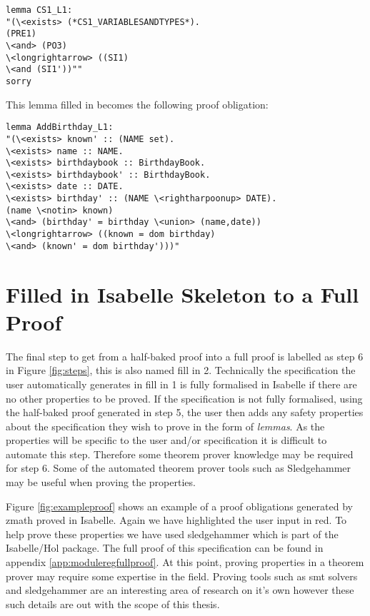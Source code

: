\begin{verbatim}
lemma CS1_L1:
"(\<exists> (*CS1_VARIABLESANDTYPES*).
(PRE1)
\<and> (PO3)
\<longrightarrow> ((SI1)
\<and (SI1'))""
sorry
\end{verbatim}

This lemma filled in becomes the following proof obligation:

\begin{verbatim}
lemma AddBirthday_L1:
"(\<exists> known' :: (NAME set).
\<exists> name :: NAME.
\<exists> birthdaybook :: BirthdayBook.
\<exists> birthdaybook' :: BirthdayBook.
\<exists> date :: DATE.
\<exists> birthday' :: (NAME \<rightharpoonup> DATE).
(name \<notin> known)
\<and> (birthday' = birthday \<union> (name,date))
\<longrightarrow> ((known = dom birthday)
\<and> (known' = dom birthday')))"
\end{verbatim}

\section{Filled in Isabelle Skeleton to a Full Proof}
\label{sec:isa2ful}

The final step to get from a half-baked proof into a full proof is labelled as
step 6 in Figure \ref{fig:steps}, this is also named fill in 2. Technically the
specification the user automatically generates in fill in 1 is fully formalised
in Isabelle if there are no other properties to be proved. If the specification
is not fully formalised, using the half-baked proof generated in step 5, the
user then adds any safety properties about the specification they wish to prove
in the form of \emph{lemmas}. As the properties will be specific to the user
and/or specification it is difficult to automate this step. Therefore some
theorem prover knowledge may be required for step 6. Some of the automated
theorem prover tools such as Sledgehammer \cite{sledgehammer} may be useful when
proving the properties.

Figure \ref{fig:exampleproof} shows an example of a proof obligations generated
by \gls{zmath} proved in Isabelle. Again we have highlighted the user input in
{\color{red}red}. To help prove these properties we have used sledgehammer
\cite{sledgehammer} which is part of the Isabelle/Hol package. The full proof of
this specification can be found in appendix \ref{app:moduleregfullproof}. At
this point, proving properties in a theorem prover may require some expertise in
the field. Proving tools such as \gls{smt} solvers
\cite{DeMoura:2011:SMT:1995376.1995394} and sledgehammer are an interesting
area of research on it's own however these such details are out with the scope
of this thesis.

